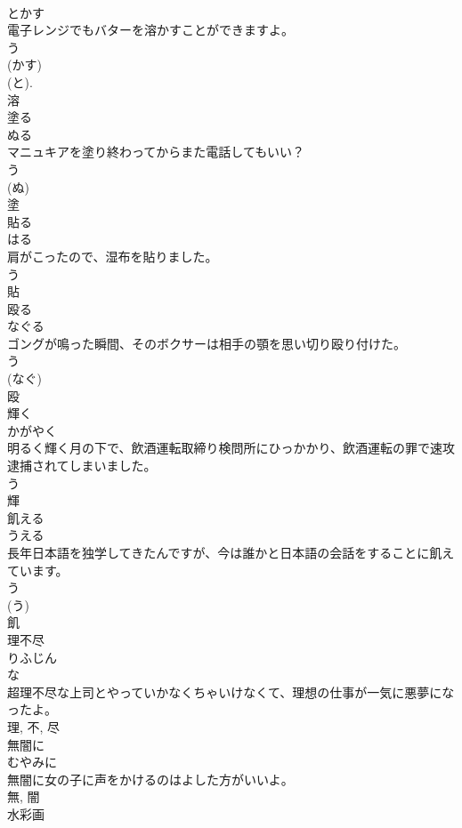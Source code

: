 \documentclass[8pt]{extreport}
\begin{document}
\begin{CJK}{UTF8}{min}
\\	とかす	
\\	電子レンジでもバターを溶かすことができますよ。	
\\	う 
\\	(かす) 
\\	(と). 
\\	溶	
\\	塗る	
\\	ぬる	
\\	マニュキアを塗り終わってからまた電話してもいい？	
\\	う 
\\	(ぬ) 
\\	塗	
\\	貼る	
\\	はる	
\\	肩がこったので、湿布を貼りました。	
\\	う 
\\	貼	
\\	殴る	
\\	なぐる	
\\	ゴングが鳴った瞬間、そのボクサーは相手の顎を思い切り殴り付けた。	
\\	う 
\\	(なぐ) 
\\	殴	
\\	輝く	
\\	かがやく	
\\	明るく輝く月の下で、飲酒運転取締り検問所にひっかかり、飲酒運転の罪で速攻逮捕されてしまいました。	
\\	う 
\\	輝	
\\	飢える	
\\	うえる	
\\	長年日本語を独学してきたんですが、今は誰かと日本語の会話をすることに飢えています。	
\\	う 
\\	(う) 
\\	飢	
\\	理不尽	
\\	りふじん	
\\	な 
\\	超理不尽な上司とやっていかなくちゃいけなくて、理想の仕事が一気に悪夢になったよ。	
\\	理, 不, 尽	
\\	無闇に	
\\	むやみに	
\\	無闇に女の子に声をかけるのはよした方がいいよ。	
\\	無, 闇	
\\	水彩画	

\end{CJK}
\end{document}
